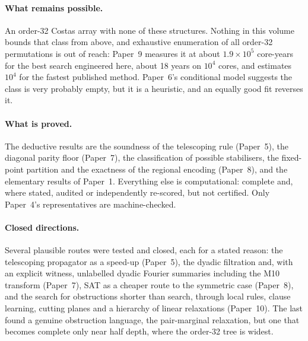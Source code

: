 \documentclass[11pt,a4paper,oneside]{report}
\theoremstyle{definition}
\begin{document}
\paragraph{What remains possible.} An order-32 Costas array with none of these structures. Nothing in
this volume bounds that class from above, and exhaustive enumeration of all order-32 permutations
is out of reach: Paper~9 measures it at about $1.9\times10^5$ core-years for the best search engineered here, about 18
years on $10^4$ cores, and
estimates $10^4$ for the fastest published method. Paper~6's conditional model suggests the class is very probably empty, but it is a
heuristic, and an equally good fit reverses it.

\paragraph{What is proved.} The deductive results are the soundness of the telescoping rule
(Paper~5), the diagonal parity floor (Paper~7), the classification of possible stabilisers, the
fixed-point partition and the exactness of the regional encoding (Paper~8), and the elementary
results of Paper~1. Everything else is computational: complete and, where stated, audited or
independently re-scored, but not certified. Only Paper~4's representatives are machine-checked.

\paragraph{Closed directions.} Several plausible routes were tested and closed, each for a stated reason:
the telescoping propagator as a speed-up (Paper~5), the dyadic filtration and, with an explicit witness,
unlabelled dyadic Fourier summaries including the M10 transform (Paper~7), SAT as a cheaper route to
the symmetric case (Paper~8), and the search for obstructions shorter than search, through local rules,
clause learning, cutting planes and a hierarchy of linear relaxations (Paper~10). The last found a genuine
obstruction language, the pair-marginal relaxation, but one that becomes complete only near half depth,
where the order-32 tree is widest.
\end{document}
